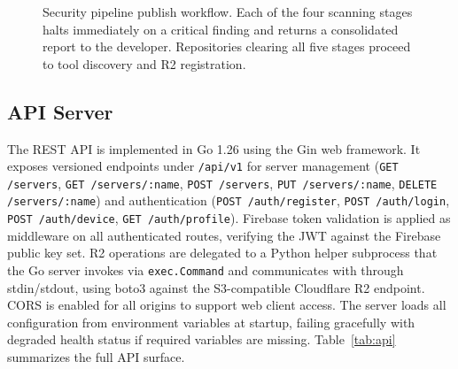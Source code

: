 \documentclass[conference]{IEEEtran}
\begin{document}
\begin{figure}[t]
  \centering
  \caption{Security pipeline publish workflow. Each of the four scanning
    stages halts immediately on a critical finding and returns a
    consolidated report to the developer. Repositories clearing all
    five stages proceed to tool discovery and R2 registration.}
  \label{fig:pipeline}
\end{figure}

\subsection{API Server}

The REST API is implemented in Go 1.26 using the Gin web framework.
It exposes versioned endpoints under \texttt{/api/v1} for server
management (\texttt{GET /servers}, \texttt{GET /servers/:name},
\texttt{POST /servers}, \texttt{PUT /servers/:name},
\texttt{DELETE /servers/:name}) and authentication
(\texttt{POST /auth/register}, \texttt{POST /auth/login},
\texttt{POST /auth/device}, \texttt{GET /auth/profile}).
Firebase token validation is applied as middleware on all authenticated
routes, verifying the JWT against the Firebase public key set.
R2 operations are delegated to a Python helper subprocess that the Go
server invokes via \texttt{exec.Command} and communicates with through
stdin/stdout, using boto3 against the S3-compatible Cloudflare R2
endpoint.
CORS is enabled for all origins to support web client access.
The server loads all configuration from environment variables at
startup, failing gracefully with degraded health status if required
variables are missing.
Table~\ref{tab:api} summarizes the full API surface.
\end{document}
